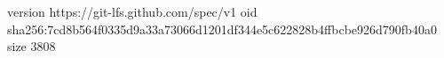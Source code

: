 version https://git-lfs.github.com/spec/v1
oid sha256:7cd8b564f0335d9a33a73066d1201df344e5c622828b4ffbcbe926d790fb40a0
size 3808
